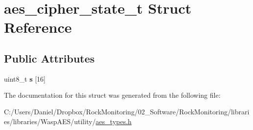 \hypertarget{structaes__cipher__state__t}{}\section{aes\+\_\+cipher\+\_\+state\+\_\+t Struct Reference}
\label{structaes__cipher__state__t}
\subsection*{Public Attributes}
\begin{DoxyCompactItemize}
\item 
uint8\+\_\+t {\bfseries s} \mbox{[}16\mbox{]}\hypertarget{structaes__cipher__state__t_a0f2eaa3bcd2d84937c79ad789d7069d9}{}\label{structaes__cipher__state__t_a0f2eaa3bcd2d84937c79ad789d7069d9}

\end{DoxyCompactItemize}


The documentation for this struct was generated from the following file\+:\begin{DoxyCompactItemize}
\item 
C\+:/\+Users/\+Daniel/\+Dropbox/\+Rock\+Monitoring/02\+\_\+\+Software/\+Rock\+Monitoring/libraries/libraries/\+Wasp\+A\+E\+S/utility/\hyperlink{aes__types_8h}{aes\+\_\+types.\+h}\end{DoxyCompactItemize}
